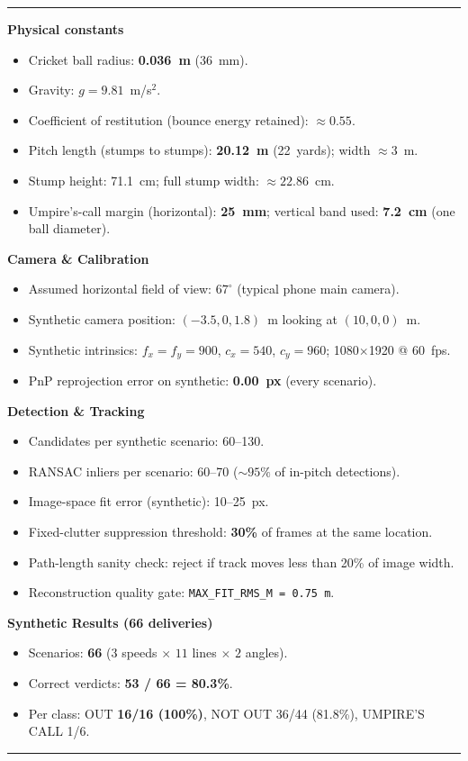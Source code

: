 \documentclass[11pt,a4paper]{article}
\newcommand{\cheatbox}[1]{%
  \par\vspace{8pt}%
  \noindent
  {\color{AccentTint}\rule{\textwidth}{0.8pt}}\par\nobreak
  \noindent
  \colorbox{MutedBg}{%
    \begin{minipage}{\dimexpr\textwidth-2\fboxsep\relax}%
      \color{black}\setlength{\parskip}{5pt}\strut #1\strut%
    \end{minipage}%
  }\par\nobreak
  \noindent
  {\color{AccentTint}\rule{\textwidth}{0.8pt}}\par%
  \vspace{8pt}%
}
\begin{document}
\cheatbox{%
\textbf{Physical constants}
\begin{itemize}
  \item Cricket ball radius: \textbf{0.036~m} (36~mm).
  \item Gravity: $g = 9.81$~m/s$^2$.
  \item Coefficient of restitution (bounce energy retained): $\approx 0.55$.
  \item Pitch length (stumps to stumps): \textbf{20.12~m} (22~yards); width $\approx 3$~m.
  \item Stump height: 71.1~cm; full stump width: ${\approx} 22.86$~cm.
  \item Umpire's-call margin (horizontal): \textbf{25~mm}; vertical band used: \textbf{7.2~cm} (one ball diameter).
\end{itemize}

\textbf{Camera \& Calibration}
\begin{itemize}
  \item Assumed horizontal field of view: \textbf{$67^{\circ}$} (typical phone main camera).
  \item Synthetic camera position: $(-3.5, 0, 1.8)$~m looking at $(10, 0, 0)$~m.
  \item Synthetic intrinsics: $f_x = f_y = 900$, $c_x = 540$, $c_y = 960$; 1080$\times$1920 @ 60~fps.
  \item PnP reprojection error on synthetic: \textbf{0.00~px} (every scenario).
\end{itemize}

\textbf{Detection \& Tracking}
\begin{itemize}
  \item Candidates per synthetic scenario: 60--130.
  \item RANSAC inliers per scenario: 60--70 (${\sim}95\%$ of in-pitch detections).
  \item Image-space fit error (synthetic): 10--25~px.
  \item Fixed-clutter suppression threshold: \textbf{30\%} of frames at the same location.
  \item Path-length sanity check: reject if track moves less than 20\% of image width.
  \item Reconstruction quality gate: \texttt{MAX\_FIT\_RMS\_M = 0.75~m}.
\end{itemize}

\textbf{Synthetic Results (66 deliveries)}
\begin{itemize}
  \item Scenarios: \textbf{66} ($3$ speeds $\times$ $11$ lines $\times$ $2$ angles).
  \item Correct verdicts: \textbf{53 / 66 = 80.3\%}.
  \item Per class: OUT \textbf{16/16 (100\%)}, NOT OUT 36/44 (81.8\%), UMPIRE'S CALL 1/6.
\end{itemize}

}
\end{document}
